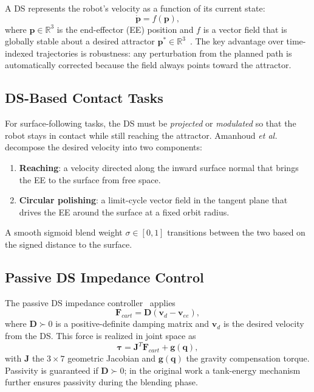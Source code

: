 \documentclass[conference]{IEEEtran}
\newcommand{\vd}{\mathbf{v}_d}
\newcommand{\veeEE}{\mathbf{v}_{ee}}
\newcommand{\pp}{\mathbf{p}}
\newcommand{\qq}{\mathbf{q}}
\newcommand{\JJ}{\mathbf{J}}
\newcommand{\DD}{\mathbf{D}}
\newcommand{\Fc}{\mathbf{F}_{cart}}
\newcommand{\tauv}{\boldsymbol{\tau}}
\newcommand{\R}{\mathbb{R}}
\begin{document}
A DS represents the robot's velocity as a function of its current state:
\begin{equation}
  \dot{\pp} = f(\pp),
  \label{eq:ds_general}
\end{equation}
where $\pp \in \R^3$ is the end-effector (EE) position and $f$ is a vector
field that is globally stable about a desired attractor
$\pp^* \in \R^3$~\cite{khansari2014}.
The key advantage over time-indexed trajectories is robustness: any
perturbation from the planned path is automatically corrected because the
field always points toward the attractor.

\subsection{DS-Based Contact Tasks}

For surface-following tasks, the DS must be \emph{projected} or
\emph{modulated} so that the robot stays in contact while still
reaching the attractor. Amanhoud \emph{et al.}~\cite{amanhoud2019}
decompose the desired velocity into two components:
\begin{enumerate}
  \item \textbf{Reaching}: a velocity directed along the inward surface normal
        that brings the EE to the surface from free space.
  \item \textbf{Circular polishing}: a limit-cycle vector field in the tangent
        plane that drives the EE around the surface at a fixed orbit radius.
\end{enumerate}
A smooth sigmoid blend weight $\sigma \in [0,1]$ transitions between the two
based on the signed distance to the surface.

\subsection{Passive DS Impedance Control}

The passive DS impedance controller~\cite{amanhoud2019} applies
\begin{equation}
  \Fc = \DD(\vd - \veeEE),
  \label{eq:impedance}
\end{equation}
where $\DD \succ 0$ is a positive-definite damping matrix and $\vd$ is the
desired velocity from the DS. This force is realized in joint space as
\begin{equation}
  \tauv = \JJ^T \Fc + \mathbf{g}(\qq),
  \label{eq:torque}
\end{equation}
with $\JJ$ the $3\times7$ geometric Jacobian and $\mathbf{g}(\qq)$ the
gravity compensation torque. Passivity is guaranteed if $\DD \succ 0$; in
the original work a tank-energy mechanism further ensures passivity during
the blending phase.
\end{document}
